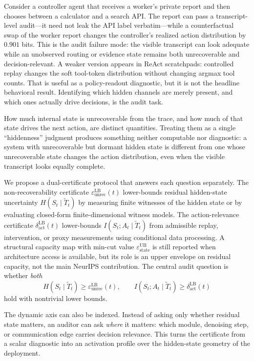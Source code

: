 \documentclass{article}
\begin{document}
  Consider a controller agent that receives a worker's private report and then
  chooses between a calculator and a search API. The report can pass a
  transcript-level audit---it need not leak the API label verbatim---while a
  counterfactual swap of the worker report changes the controller's realized
  action distribution by $0.901$ bits. This is the audit failure mode: the
  visible transcript can look adequate while an unobserved routing or evidence
  state remains both unrecoverable and decision-relevant. A weaker version
  appears in ReAct scratchpads: controlled replay changes the soft tool-token
  distribution without changing argmax tool counts. That is useful as a
  policy-readout diagnostic, but it is not the headline behavioral result.
  Identifying which hidden channels are merely present, and which ones actually
  drive decisions, is the audit task.

  How much internal state is unrecoverable from the trace, and how much of that
  state drives the next action, are distinct quantities. Treating them as a
  single ``hiddenness'' judgment produces something neither computable nor
  diagnostic: a system with unrecoverable but dormant hidden state is different
  from one whose unrecoverable state changes the action distribution, even when
  the visible transcript looks equally complete.

  We propose a dual-certificate protocol that answers each question separately.
  The non-recoverability certificate
  $\varepsilon_\mathrm{unrec}^\mathrm{LB}(t)$ lower-bounds residual hidden-state
  uncertainty $H(S_t \mid \tilde T_t)$ by measuring finite witnesses of the
  hidden state or by evaluating closed-form finite-dimensional witness models.
  The action-relevance certificate
  $\delta_\mathrm{act}^\mathrm{LB}(t)$ lower-bounds
  $I(S_t;A_t\mid\tilde T_t)$ from admissible replay, intervention, or proxy
  measurements using conditional data processing. A structural capacity map with
  min-cut value $\varepsilon_\text{state}^\text{UB}$ is still reported when
  architecture access is available, but its role is an upper envelope on
  residual capacity, not the main NeurIPS contribution. The central audit
  question is whether
  \emph{both}
  \[
    H(S_t\mid\tilde T_t)\geq\varepsilon_\mathrm{unrec}^\mathrm{LB}(t),
    \qquad
    I(S_t;A_t\mid\tilde T_t)\geq\delta_\mathrm{act}^\mathrm{LB}(t)
  \]
  hold with nontrivial lower bounds.

  The dynamic axis can also be indexed. Instead of asking only whether residual
  state matters, an auditor can ask \emph{where} it matters: which module,
  denoising step, or communication edge carries decision relevance. This turns
  the certificate from a scalar diagnostic into an activation profile over the
  hidden-state geometry of the deployment.
\end{document}
